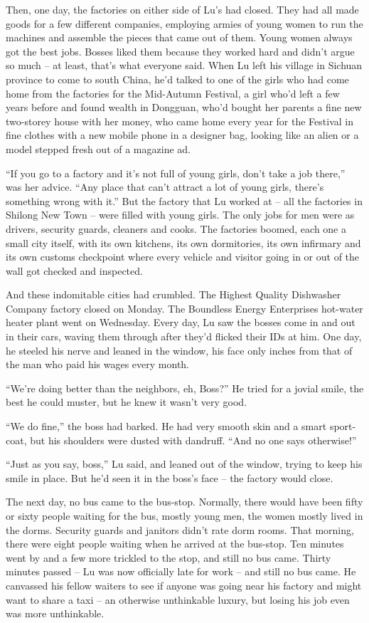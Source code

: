 Then, one day, the factories on either side of Lu's had closed.
They had all made goods for a few different companies, employing
armies of young women to run the machines and assemble the pieces
that came out of them. Young women always got the best jobs. Bosses
liked them because they worked hard and didn't argue so much -- at
least, that's what everyone said. When Lu left his village in
Sichuan province to come to south China, he'd talked to one of the
girls who had come home from the factories for the Mid-Autumn
Festival, a girl who'd left a few years before and found wealth in
Dongguan, who'd bought her parents a fine new two-storey house with
her money, who came home every year for the Festival in fine
clothes with a new mobile phone in a designer bag, looking like an
alien or a model stepped fresh out of a magazine ad.

``If you go to a factory and it's not full of young girls, don't
take a job there,'' was her advice. ``Any place that can't attract a
lot of young girls, there's something wrong with it.'' But the
factory that Lu worked at -- all the factories in Shilong New Town
-- were filled with young girls. The only jobs for men were as
drivers, security guards, cleaners and cooks. The factories boomed,
each one a small city itself, with its own kitchens, its own
dormitories, its own infirmary and its own customs checkpoint where
every vehicle and visitor going in or out of the wall got checked
and inspected.

And these indomitable cities had crumbled. The Highest Quality
Dishwasher Company factory closed on Monday. The Boundless Energy
Enterprises hot-water heater plant went on Wednesday. Every day, Lu
saw the bosses come in and out in their cars, waving them through
after they'd flicked their IDs at him. One day, he steeled his
nerve and leaned in the window, his face only inches from that of
the man who paid his wages every month.

``We're doing better than the neighbors, eh, Boss?'' He tried for a
jovial smile, the best he could muster, but he knew it wasn't very
good.

``We do fine,'' the boss had barked. He had very smooth skin and a
smart sport-coat, but his shoulders were dusted with dandruff. ``And
no one says otherwise!''

``Just as you say, boss,'' Lu said, and leaned out of the window,
trying to keep his smile in place. But he'd seen it in the boss's
face -- the factory would close.

The next day, no bus came to the bus-stop. Normally, there would
have been fifty or sixty people waiting for the bus, mostly young
men, the women mostly lived in the dorms. Security guards and
janitors didn't rate dorm rooms. That morning, there were eight
people waiting when he arrived at the bus-stop. Ten minutes went by
and a few more trickled to the stop, and still no bus came. Thirty
minutes passed -- Lu was now officially late for work -- and still
no bus came. He canvassed his fellow waiters to see if anyone was
going near his factory and might want to share a taxi -- an
otherwise unthinkable luxury, but losing his job even was more
unthinkable.

